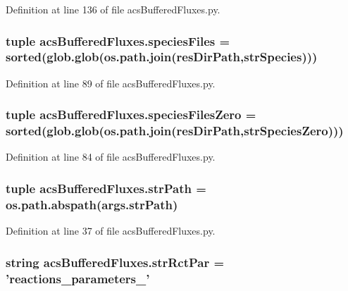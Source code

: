 Definition at line 136 of file acs\-Buffered\-Fluxes.\-py.

\hypertarget{a00098_ae41c9dafcdeb581e70eeb889d16c6551}{
\subsubsection[{species\-Files}]{\setlength{\rightskip}{0pt plus 5cm}tuple acs\-Buffered\-Fluxes.\-species\-Files = sorted(glob.\-glob(os.\-path.\-join({\bf res\-Dir\-Path},{\bf str\-Species})))}}\label{a00098_ae41c9dafcdeb581e70eeb889d16c6551}


Definition at line 89 of file acs\-Buffered\-Fluxes.\-py.

\hypertarget{a00098_a8c18127c32adcc1a3403749a047270e5}{
\subsubsection[{species\-Files\-Zero}]{\setlength{\rightskip}{0pt plus 5cm}tuple acs\-Buffered\-Fluxes.\-species\-Files\-Zero = sorted(glob.\-glob(os.\-path.\-join({\bf res\-Dir\-Path},{\bf str\-Species\-Zero})))}}\label{a00098_a8c18127c32adcc1a3403749a047270e5}


Definition at line 84 of file acs\-Buffered\-Fluxes.\-py.

\hypertarget{a00098_a8932cabcf73065a531104c53a324508a}{
\subsubsection[{str\-Path}]{\setlength{\rightskip}{0pt plus 5cm}tuple acs\-Buffered\-Fluxes.\-str\-Path = os.\-path.\-abspath(args.\-str\-Path)}}\label{a00098_a8932cabcf73065a531104c53a324508a}


Definition at line 37 of file acs\-Buffered\-Fluxes.\-py.

\hypertarget{a00098_ac571c8d78a216f58ebc1e37bef25a541}{
\subsubsection[{str\-Rct\-Par}]{\setlength{\rightskip}{0pt plus 5cm}string acs\-Buffered\-Fluxes.\-str\-Rct\-Par = 'reactions\-\_\-parameters\-\_\-'}}\label{a00098_ac571c8d78a216f58ebc1e37bef25a541}


